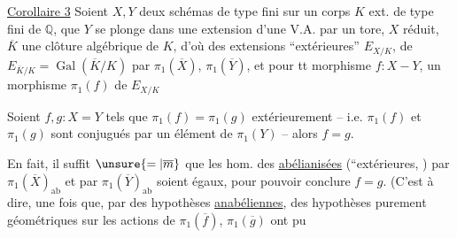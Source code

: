 \uline{Corollaire 3} Soient  $X,Y$ deux schémas de type fini sur un corps $K$ ext. de type fini de $\mathbb Q$,   que $Y$ se plonge dans une  extension d'une V.A. par un tore, $X$ réduit,   $\overline K$ une clôture algébrique de $K$, d'où des extensions ``extérieures'' $E_{X/K}$,  de $E_{\overline K/K}=\operatorname{Gal}(\overline K/K)$ par $\pi_1(\overline X)$, $\pi_1(\overline Y)$, et pour tt morphisme $f:X-Y$, un morphisme $\pi_1(f)$ de $E_{X/K}$ 

Soient $f,g:X=Y$ tels que $\pi_1(f)=\pi_1(g)$ extérieurement -- i.e. $\pi_1(f)$ et $\pi_1(g)$ sont conjugués par un élément de $\pi_1(Y)$ -- alors $f=g$.

En fait, il suffit $\unsure{=|\overline m}$ que les hom. des \uline{abélianisées} (``extérieures, ) par $\pi_1(\overline X)_{\mathrm{ab}}$ et par $\pi_1(\overline Y)_{\mathrm{ab}}$ soient égaux, pour pouvoir conclure $f=g$. (C'est à dire, une fois que,  par des hypothèses \uline{anabéliennes}, des hypothèses purement géométriques sur les actions de $\pi_1(\overline f)$, $\pi_1(\overline g)$ ont pu 

